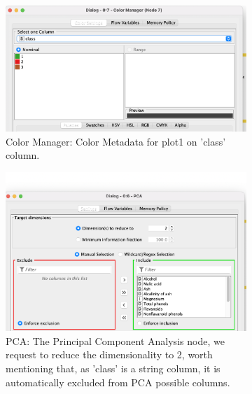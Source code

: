 \documentclass[11pt]{article}
\begin{document}
			\begin{figure}[H]
				\centering
				\begin{subfigure}{0.4\textwidth}
					\includegraphics[width=\textwidth]{res/t1/t11/t11-color-manager-conf}
					\caption{Color Manager: Color Metadata for plot1 on 'class' column.}
					\label{fig:first}
				\end{subfigure}
				\hfil
				\begin{subfigure}{0.4\textwidth}
					\includegraphics[width=\textwidth]{res/t1/t11/t11-PCA-conf}
					\caption{PCA: The Principal Component Analysis node, we request to reduce the dimensionality to 2, worth mentioning that, as 'class' is a string column, it is automatically excluded from PCA possible columns.}
					\label{fig:first}
				\end{subfigure}
				\hfill
				\begin{subfigure}{0.4\textwidth}

\end{subfigure}
\end{figure}
\end{document}
